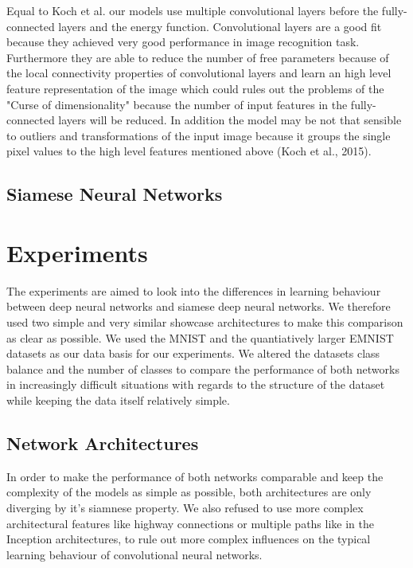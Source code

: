 \documentclass[a4paper,pt12]{article}
\begin{document}
Equal to Koch et al. our models use multiple convolutional layers before the fully-connected layers and the energy function. Convolutional layers are a good fit because they achieved very good performance in image recognition task. Furthermore they are able to reduce the number of free parameters because of the local connectivity properties of convolutional layers and learn an high level feature representation of the image which could rules out the problems of the "Curse of dimensionality" because the number of input features in the fully-connected layers will be reduced. In addition the model may be not that sensible to outliers and transformations of the input image because it groups the single pixel values to the high level features mentioned above (Koch et al., 2015).

\subsection{Siamese Neural Networks}

\section{Experiments}
The experiments are aimed to look into the differences in learning behaviour between deep neural networks and siamese deep neural networks. We therefore used two simple and very similar showcase  architectures to make this comparison as clear as possible. We used the MNIST and the quantiatively larger EMNIST datasets as our data basis for our experiments. We altered the datasets class balance and the number of classes to compare the performance of both networks in increasingly difficult situations with regards to the structure of the dataset while keeping the data itself relatively simple.  

\subsection{Network Architectures}
In order to make the performance of both networks comparable and keep the complexity of the models as simple as possible, both architectures are only diverging by it's siamnese property. We also refused to use more complex architectural features like highway connections or multiple paths like in the Inception architectures, to rule out more complex influences on the typical learning behaviour of convolutional neural networks.
\end{document}
